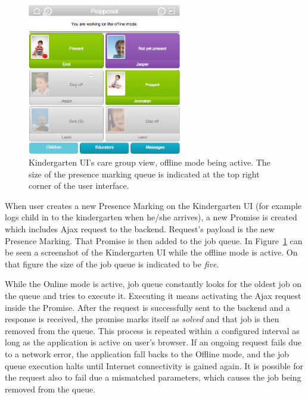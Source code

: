\begin{figure}[t]
\begin{center}
\includegraphics[width=0.6\textwidth]{assets/offline-ui.png}
\end{center}
\caption{Kindergarten UI's care group view, offline mode being active. The size of the presence marking queue is indicated at the top right corner of the user interface.}
\label{fig:offline-ui}
\end{figure}


When user creates a new Presence Marking on the Kindergarten UI (for example logs child in to the kindergarten when he/she arrives), a new Promise is created which includes Ajax request to the backend. Request's payload is the new Presence Marking. That Promise is then added to the job queue. In Figure~\ref{fig:offline-ui} can be seen a screenshot of the Kindergarten UI while the offline mode is active. On that figure the size of the job queue is indicated to be \textit{five}.

While the Online mode is active, job queue constantly looks for the oldest job on the queue and tries to execute it. Executing it means activating the Ajax request inside the Promise. After the request is successfully sent to the backend and a response is received, the promise marks itself as \textit{solved} and that job is then removed from the queue. This process is repeated within a configured interval as long as the application is active on user's browser. If an ongoing request fails due to a network error, the application fall backs to the Offline mode, and the job queue execution halts until Internet connectivity is gained again. It is possible for the request also to fail due a mismatched parameters, which causes the job being removed from the queue.

